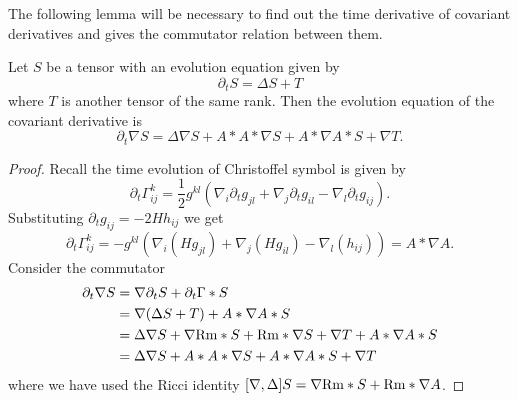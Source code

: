 The following lemma will be necessary to find out the time derivative of covariant derivatives and gives the commutator relation between them. 
\begin{lemma}
    Let $ S $ be a tensor with an evolution equation given by 
    \[ \partial_{t} S = \Delta S + T \]
    where $ T $ is another tensor of the same rank. Then the evolution equation of the covariant derivative is \begin{equation}
        \partial_{t}\nabla S = \Delta \nabla S + A * A  * \nabla S + A * \nabla A * S + \nabla T.
    \end{equation}
\end{lemma}
\begin{proof}
    Recall the time evolution of Christoffel symbol is given by     
    \begin{equation}
        \partial_{t}\Gamma_{ij}^{k} = \frac{1}{2}g^{kl}(\nabla_{i}\partial_{t}g_{jl}+ \nabla_{j}\partial_{t}g_{il}-\nabla_{l}\partial_{t}g_{ij}).
    \end{equation}
    Substituting $ \partial_{t}g_{ij} = -2Hh_{ij} $ we get 
    \[ \partial_{t}\Gamma_{ij}^{k} = -g^{kl}(\nabla_{i}(Hg_{jl})+ \nabla_{j}(Hg_{il})-\nabla_{l}(h_{ij})) = A * \nabla A. \]
    Consider the commutator \begin{align*}
        \partial_{t}\nabla S & = \nabla \partial_{t}S + \partial_{t}\Gamma *S \\
        & = \nabla(\Delta S+T) + A * \nabla A * S \\
        & = \Delta \nabla S + \nabla \text{Rm} * S + \text{Rm} * \nabla S  + \nabla T + A * \nabla A * S \\
        & = \Delta \nabla S + A * A  * \nabla S + A * \nabla A * S + \nabla T
    \end{align*}
    where we have used the Ricci identity $ [\nabla, \Delta]S = \nabla \text{Rm} * S + \text{Rm} * \nabla A $.
\end{proof}



